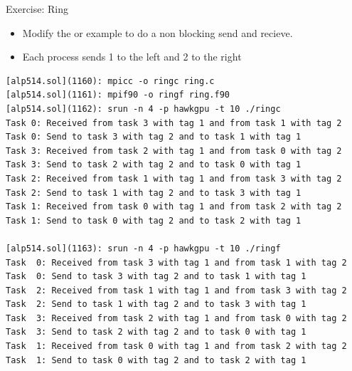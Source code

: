 \documentclass[9pt,c]{beamer}
\begin{document}
\begin{frame}{Exercise: Ring}
  \begin{itemize}
    \item Modify the  or  example to do a non blocking send and recieve.
    \item Each process sends 1 to the left and 2 to the right
  \end{itemize}
  \framebreak
  \begin{exampleblock}{}
    \begin{lstlisting}[basicstyle=\scriptsize\ttfamily]
[alp514.sol](1160): mpicc -o ringc ring.c
[alp514.sol](1161): mpif90 -o ringf ring.f90
[alp514.sol](1162): srun -n 4 -p hawkgpu -t 10 ./ringc
Task 0: Received from task 3 with tag 1 and from task 1 with tag 2
Task 0: Send to task 3 with tag 2 and to task 1 with tag 1
Task 3: Received from task 2 with tag 1 and from task 0 with tag 2
Task 3: Send to task 2 with tag 2 and to task 0 with tag 1
Task 2: Received from task 1 with tag 1 and from task 3 with tag 2
Task 2: Send to task 1 with tag 2 and to task 3 with tag 1
Task 1: Received from task 0 with tag 1 and from task 2 with tag 2
Task 1: Send to task 0 with tag 2 and to task 2 with tag 1

[alp514.sol](1163): srun -n 4 -p hawkgpu -t 10 ./ringf
Task  0: Received from task 3 with tag 1 and from task 1 with tag 2
Task  0: Send to task 3 with tag 2 and to task 1 with tag 1
Task  2: Received from task 1 with tag 1 and from task 3 with tag 2
Task  2: Send to task 1 with tag 2 and to task 3 with tag 1
Task  3: Received from task 2 with tag 1 and from task 0 with tag 2
Task  3: Send to task 2 with tag 2 and to task 0 with tag 1
Task  1: Received from task 0 with tag 1 and from task 2 with tag 2
Task  1: Send to task 0 with tag 2 and to task 2 with tag 1
    \end{lstlisting}
  \end{exampleblock}
\end{frame}
\end{document}
